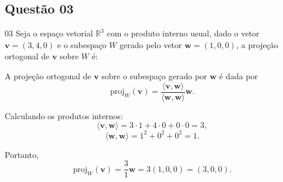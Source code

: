 \subsection*{Questão 03}

\begin{questionbox}{03}
  Seja o espaço vetorial $\mathbb{R}^3$ com o produto interno usual, dado o vetor $\mathbf{v} = (3,4,0)$ e o subespaço $W$ gerado pelo vetor $\mathbf{w} = (1,0,0)$, a projeção ortogonal de $\mathbf{v}$ sobre $W$ é:
\end{questionbox}

\newpage

\begin{solutionbox}
  A projeção ortogonal de $\mathbf{v}$ sobre o subespaço gerado por $\mathbf{w}$ é dada por
  \[
  \mathrm{proj}_{W}(\mathbf{v}) = \frac{\langle \mathbf{v}, \mathbf{w} \rangle}{\langle \mathbf{w}, \mathbf{w} \rangle} \mathbf{w}.
  \]

  Calculando os produtos internos:
  \[
  \langle \mathbf{v}, \mathbf{w} \rangle = 3 \cdot 1 + 4 \cdot 0 + 0 \cdot 0 = 3,
  \]
  \[
  \langle \mathbf{w}, \mathbf{w} \rangle = 1^2 + 0^2 + 0^2 = 1.
  \]

  Portanto,
  \[
  \mathrm{proj}_{W}(\mathbf{v}) = \frac{3}{1} \mathbf{w} = 3(1,0,0) = (3,0,0).
  \]
\end{solutionbox}